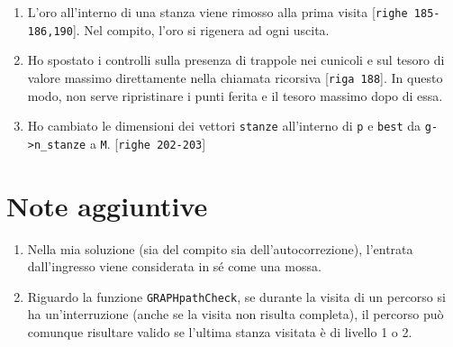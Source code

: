 \documentclass[a4paper]{article}
\newcommand{\code}[1]{\texttt{#1}}
\newcommand{\riga}[1]{[\code{riga #1}]}
\newcommand{\righe}[1]{[\code{righe #1}]}
\begin{document}
\begin{itemize}
\begin{enumerate}
                \item L'oro all'interno di una stanza viene rimosso alla prima visita \righe{185-186,190}. Nel compito, l'oro si rigenera ad ogni uscita.
                \item Ho spostato i controlli sulla presenza di trappole nei cunicoli e sul tesoro di valore massimo direttamente nella chiamata ricorsiva \riga{188}. In questo modo, non serve ripristinare i punti ferita e il tesoro massimo dopo di essa.
                \item Ho cambiato le dimensioni dei vettori \code{stanze} all'interno di \code{p} e \code{best} da \code{g->n\_stanze} a \code{M}. \righe{202-203}
            \end{enumerate}
    \end{itemize}

    \section{Note aggiuntive}
    \begin{enumerate}
        \item Nella mia soluzione (sia del compito sia dell'autocorrezione), l'entrata dall'ingresso viene considerata in sé come una mossa.
        \item Riguardo la funzione \code{GRAPHpathCheck}, se durante la visita di un percorso si ha un'interruzione (anche se la visita non risulta completa), il percorso può comunque risultare valido se l'ultima stanza visitata è di livello 1 o 2.
    \end{enumerate}
\end{document}
